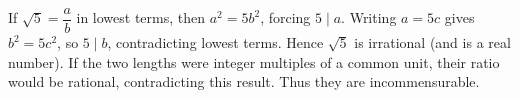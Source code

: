 If $\sqrt5=\dfrac{a}{b}$ in lowest terms, then $a^2=5b^2$, forcing $5\mid a$. Writing $a=5c$ gives $b^2=5c^2$, so $5\mid b$, contradicting lowest terms. Hence $\sqrt5$ is irrational (and is a real number). If the two lengths were integer multiples of a common unit, their ratio would be rational, contradicting this result. Thus they are incommensurable.
